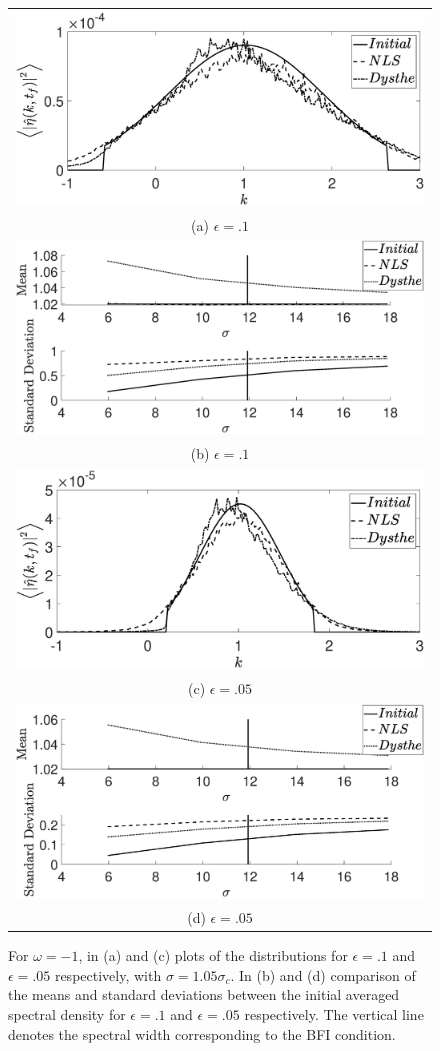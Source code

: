 \documentclass[a4paper,11pt]{article}
\begin{document}
\begin{figure}[!ht]
\centering
\begin{tabular}{c}
\includegraphics[width=.65\textwidth]{pdf_w_n1_ep_pt1_Nens_512} \\
(a) $\epsilon=.1$\\
\includegraphics[width=.65\textwidth]{omega_n1_mean_std_plot_ep_pt1}\\
(b) $\epsilon=.1$ \\
\includegraphics[width=.65\textwidth]{pdf_w_n1_ep_pt05_Nens_512}\\
(c) $\epsilon=.05$ \\
\includegraphics[width=.65\textwidth]{omega_n1_mean_std_plot_ep_pt05}\\
(d) $\epsilon=.05$
\end{tabular}
\caption{For $\omega=-1$, in (a) and (c) plots of the distributions for $\epsilon=.1$ and $\epsilon=.05$ respectively,  with $\sigma=1.05\sigma_{c}$.  In (b) and (d) comparison of the means and standard deviations between the initial averaged spectral density for $\epsilon=.1$ and $\epsilon=.05$ respectively.  The vertical line denotes the spectral width corresponding to the BFI condition.}
\label{fig:meanstdomn1}
\end{figure}
\end{document}
